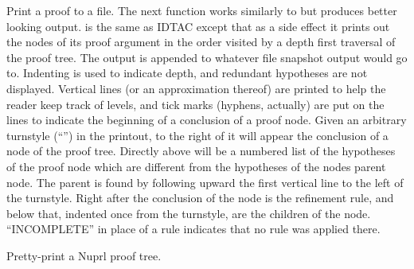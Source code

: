 Print a proof to a file.  The next function works similarly to  but
produces better looking output.
 is the same as IDTAC
except that as a side effect it prints out the nodes of its proof
argument in the order visited by a depth first traversal of the proof
tree.  The output is appended to whatever file snapshot output would go
to.  Indenting is used to indicate depth, and redundant hypotheses are
not displayed.  Vertical lines (or an approximation thereof) are printed
to help the reader keep track of levels, and tick marks (hyphens,
actually) are put on the lines to indicate the beginning of a conclusion
of a proof node.  Given an arbitrary turnstyle (``\tid{>>}'') in the printout,
to the right of it will appear the conclusion of a node of the proof
tree.  Directly above will be a numbered list of the hypotheses of the
proof node which are different from the hypotheses of the nodes parent
node.  The parent is found by following upward the first vertical line
to the left of the turnstyle.  Right after the conclusion of the node is
the refinement rule, and below that, indented once from the turnstyle,
are the children of the node.  ``INCOMPLETE'' in place of a rule indicates
that no rule was applied there.

Pretty-print a Nuprl proof tree. 

